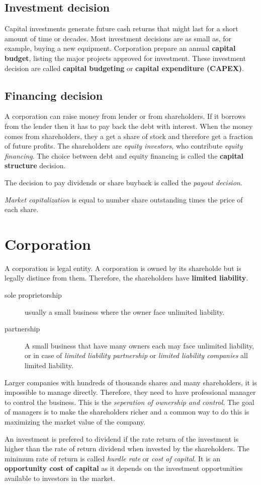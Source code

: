 \subsection{Investment decision}
Capital investments generate future cash returns that might last for a short amount of time or decades. Most investment decisions are as small as, for example, buying a new equipment. Corporation prepare an annual \textbf{capital budget}, listing the major projects approved for investment. These investment decision are called \textbf{capital budgeting} or \textbf{capital expenditure (CAPEX)}.
\subsection{Financing decision}
A corporation can raise money from lender or from shareholders. If it borrows from the lender then it has to pay back the debt with interest. When the money comes from shareholders, they a get a share of stock and therefore get a fraction of future profits. The shareholders are \textit{equity investors}, who contribute \textit{equity financing}. The choice between debt and equity financing is called the \textbf{capital structure} decision. 

The decision to pay dividends or share buyback is called the \textit{payout decision}.

\textit{Market capitalization} is equal to number share outstanding times the price of each share.

\section{Corporation}
A corporation is legal entity. A corporation is owned by its shareholde but is legally distince from them. Therefore, the shareholders have \textbf{limited liability}. 

\begin{description}
    \item[sole proprietorship] usually a small business where the owner face unlimited liability.
    \item[partnership] A small business that have many owners each may face unlimited liability, or in case of \textit{limited liability partnership} or \textit{limited liability companies} all limited liability.
\end{description}

Larger companies with hundreds of thousands shares and many shareholders, it is impossible to manage directly. Therefore, they need to have professional manager to control the business. This is the \textit{seperation of ownership and control}. The goal of managers is to make the shareholders richer and a common way to do this is  maximizing the market value of the company. 

An investment is prefered to dividend if the rate return of the investment is higher than the rate of return dividend when invested by the shareholders. The minimum rate of return is called \textit{hurdle rate} or \textit{cost of capital}. It is an \textbf{opportunity cost of capital} as it depends on the investment opportunities available to investors in the market.